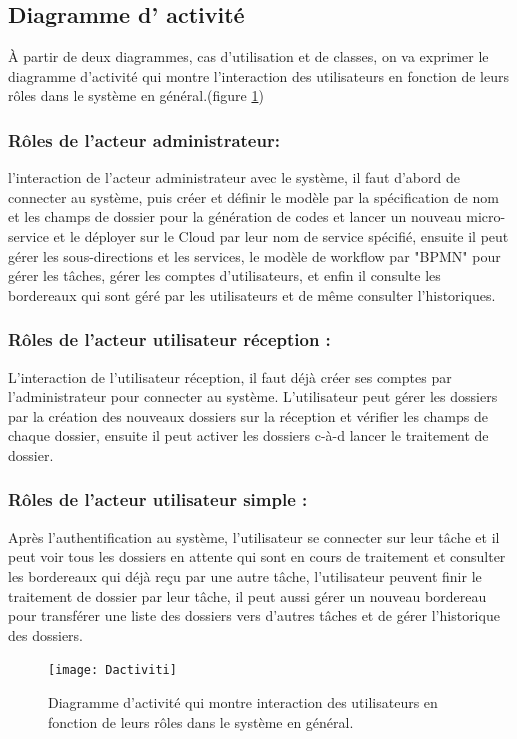 \subsection{Diagramme d' activité  }

À partir de deux diagrammes, cas d'utilisation et de classes,  on va exprimer  le diagramme d'activité qui  montre l'interaction des  utilisateurs   en fonction de leurs rôles dans le système en général.(figure \ref{fig:dactiviti})

\subsubsection{Rôles de l'acteur administrateur: }
l'interaction de l'acteur administrateur avec le système, il faut d'abord de connecter au système, puis créer et définir le modèle par la spécification de nom et les champs de dossier pour la génération de codes et lancer un nouveau micro-service et le déployer sur le Cloud par leur nom de service spécifié, ensuite il peut gérer les sous-directions et les services, le modèle de workflow par "BPMN" pour gérer les tâches, gérer les comptes d'utilisateurs, et enfin il  consulte les bordereaux qui sont géré par les utilisateurs et de même consulter l'historiques.
\subsubsection{Rôles de l'acteur utilisateur réception : }
L'interaction de l'utilisateur réception, il faut déjà créer ses comptes par l'administrateur pour connecter au système.  L'utilisateur peut gérer les dossiers par la création des nouveaux dossiers sur la réception et vérifier les champs de chaque dossier, ensuite il peut activer les dossiers c-à-d lancer le  traitement de dossier.

\subsubsection{Rôles de l'acteur utilisateur simple : } 
Après l'authentification au système,  l'utilisateur se connecter sur leur tâche et il peut voir tous les dossiers en attente qui sont en cours de traitement et consulter les bordereaux qui déjà reçu par une autre tâche, l'utilisateur peuvent finir le traitement de dossier par leur tâche, il peut aussi gérer un nouveau bordereau pour transférer une liste des dossiers vers d'autres tâches et de gérer l'historique des dossiers.
   
   \begin{figure}[H]
   	\centering
   	\texttt{[image: Dactiviti]}
   	\caption{Diagramme d'activité qui  montre interaction des  utilisateurs   en fonction de leurs rôles dans le système en général.}
   	\label{fig:dactiviti}
   \end{figure}
     
